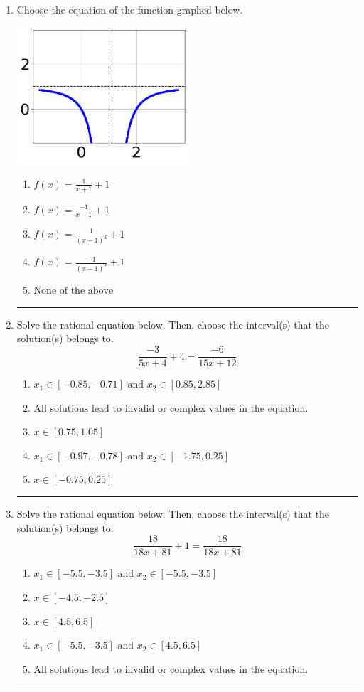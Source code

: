 \documentclass[14pt]{extbook}
\newcommand{\litem}[1]{\item#1\hspace*{-1cm}\rule{\textwidth}{0.4pt}}
\begin{document}
\begin{enumerate}
{\begin{enumerate}[label=\Alph*.]
\end{enumerate} }
\litem{
Choose the equation of the function graphed below.
\begin{center}
    \includegraphics[width=0.5\textwidth]{../Figures/rationalGraphToEquationB.png}
\end{center}
\begin{enumerate}[label=\Alph*.]
\item \( f(x) = \frac{1}{x + 1} + 1 \)
\item \( f(x) = \frac{-1}{x - 1} + 1 \)
\item \( f(x) = \frac{1}{(x + 1)^2} + 1 \)
\item \( f(x) = \frac{-1}{(x - 1)^2} + 1 \)
\item \( \text{None of the above} \)

\end{enumerate} }
\litem{
Solve the rational equation below. Then, choose the interval(s) that the solution(s) belongs to.\[ \frac{-3}{5x + 4} + 4 = \frac{-6}{15x + 12} \]\begin{enumerate}[label=\Alph*.]
\item \( x_1 \in [-0.85, -0.71] \text{ and } x_2 \in [0.85,2.85] \)
\item \( \text{All solutions lead to invalid or complex values in the equation.} \)
\item \( x \in [0.75,1.05] \)
\item \( x_1 \in [-0.97, -0.78] \text{ and } x_2 \in [-1.75,0.25] \)
\item \( x \in [-0.75,0.25] \)

\end{enumerate} }
\litem{
Solve the rational equation below. Then, choose the interval(s) that the solution(s) belongs to.\[ \frac{18}{18x + 81} + 1 = \frac{18}{18x + 81} \]\begin{enumerate}[label=\Alph*.]
\item \( x_1 \in [-5.5, -3.5] \text{ and } x_2 \in [-5.5,-3.5] \)
\item \( x \in [-4.5,-2.5] \)
\item \( x \in [4.5,6.5] \)
\item \( x_1 \in [-5.5, -3.5] \text{ and } x_2 \in [4.5,6.5] \)
\item \( \text{All solutions lead to invalid or complex values in the equation.} \)

\end{enumerate} }
\end{enumerate}
\end{document}
